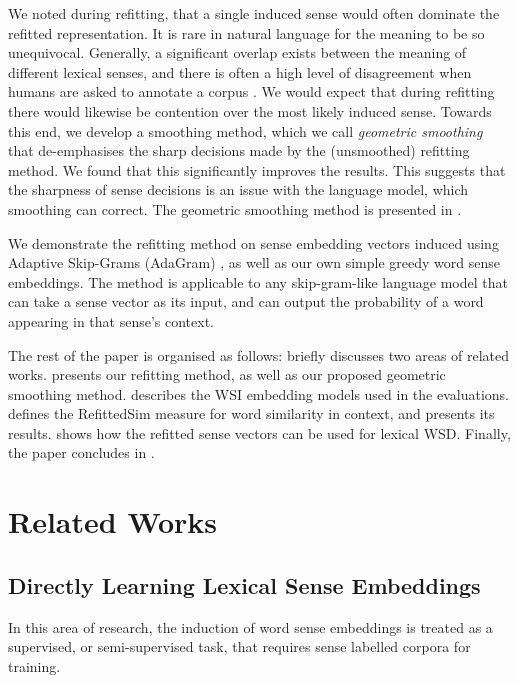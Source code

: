 \documentclass{llncs}
\def\parencite{\cite}
\begin{document}
We noted during refitting, that a single induced sense would often dominate the refitted representation.
It is rare in natural language for the meaning to be so unequivocal.
Generally, a significant overlap exists between the meaning of different lexical senses, and there is often a high level of disagreement when humans are asked to annotate a corpus \parencite{veronis1998study}.
We would expect that during refitting there would likewise be contention over the most likely induced sense.
Towards this end, we develop a smoothing method, which we call \emph{geometric smoothing} that de-emphasises the sharp decisions made by the (unsmoothed) refitting method.
We found that this significantly improves the results.
This suggests that the sharpness of sense decisions is an issue with the language model, which smoothing can correct.
The geometric smoothing method is presented in .


We demonstrate the refitting method on sense embedding vectors induced using Adaptive Skip-Grams (AdaGram) \parencite{AdaGrams}, as well as our own simple greedy word sense embeddings.
The method is applicable to any skip-gram-like language model that can take a sense vector as its input, and can output the probability of a word appearing in that sense's context.


The rest of the paper is organised as follows:  briefly discusses two areas of related works.
 presents our refitting method, as well as our proposed geometric smoothing method.
 describes the WSI embedding models used in the evaluations.
 defines the RefittedSim measure for word similarity in context, and presents its results.
 shows how the refitted sense vectors can be used for lexical WSD.
Finally, the paper concludes in .

\section{Related Works} \label{relatedwords}

\subsection{Directly Learning Lexical Sense Embeddings}
In this area of research, the induction of word sense embeddings is treated as a supervised, or semi-supervised task, that requires sense labelled corpora for training.
\end{document}
